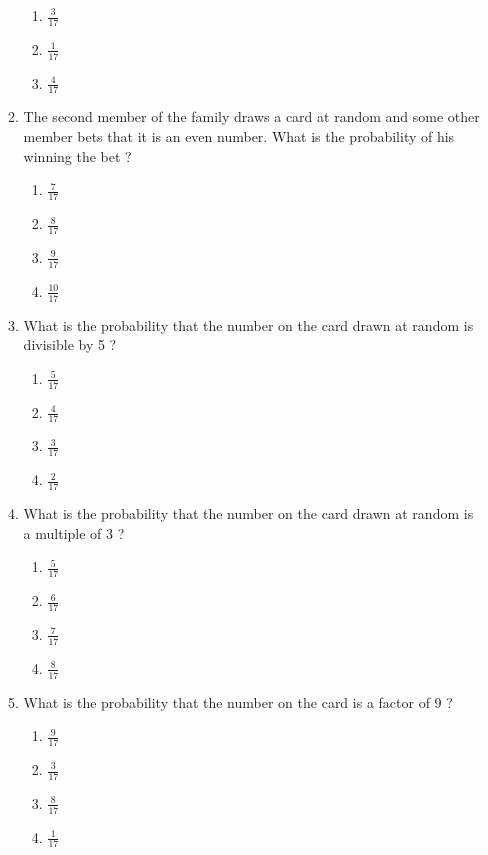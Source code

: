 \documentclass{article}
\begin{document}
\begin{enumerate}
\begin{enumerate}
\begin{enumerate}
	\item $\frac{3}{17}$
	\item $\frac{1}{17}$ 
	\item $\frac{4}{17}$ 
	\end{enumerate}
\item The second member of the family draws a card at random and some other member bets that it is an even number. What is the probability of his winning the bet ? 
	\begin{enumerate}
	\item $\frac{7}{17}$
	\item $\frac{8}{17}$
	\item $\frac{9}{17}$ 
	\item $\frac{10}{17}$ 
	\end{enumerate}
\item What is the probability that the number on the card drawn at random is divisible by 5 ? 
	\begin{enumerate}
	\item $\frac{5}{17}$
	\item $\frac{4}{17}$
	\item $\frac{3}{17}$ 
	\item $\frac{2}{17}$ 
	\end{enumerate}
\item What is the probability that the number on the card drawn at random is a multiple of 3 ? 
	\begin{enumerate}
	\item $\frac{5}{17}$
	\item $\frac{6}{17}$
	\item $\frac{7}{17}$ 
	\item $\frac{8}{17}$ 
	\end{enumerate}
\item What is the probability that the number on the card is a factor of 9 ?
	\begin{enumerate}
	\item $\frac{9}{17}$
	\item $\frac{3}{17}$
	\item $\frac{8}{17}$ 
	\item $\frac{1}{17}$ 
	\end{enumerate}
\end{enumerate}
		


\end{enumerate}
\end{document}
